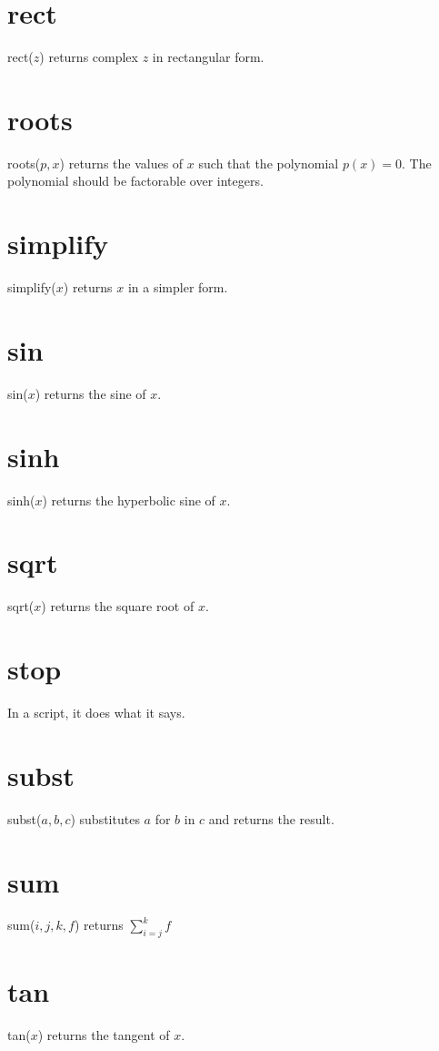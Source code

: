\documentclass[12pt,openany]{report}
\begin{document}
\section*{rect}
rect($z$) returns complex $z$ in rectangular form.

\section*{roots}
roots($p,x$) returns the values of $x$ such that the polynomial $p(x)=0$.
The polynomial should be factorable over integers.

\section*{simplify}
simplify($x$) returns $x$ in a simpler form.

\section*{sin}
sin($x$) returns the sine of $x$.

\section*{sinh}
sinh($x$) returns the hyperbolic sine of $x$.

\section*{sqrt}
sqrt($x$) returns the square root of $x$.

\section*{stop}
In a script, it does what it says.

\section*{subst}
subst($a,b,c$) substitutes $a$ for $b$ in $c$ and returns the result.

\section*{sum}
sum($i,j,k,f$) returns $\displaystyle\sum_{i=j}^k f$

\section*{tan}
tan($x$) returns the tangent of $x$.
\end{document}
